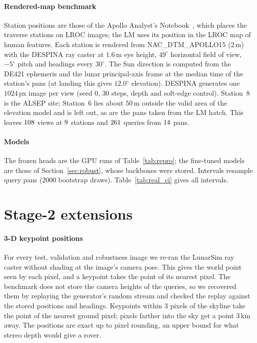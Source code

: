 \documentclass[letterpaper,journal]{IEEEtran}
\begin{document}
\paragraph*{Rendered-map benchmark} Station positions are those of the Apollo Analyst's
Notebook~\cite{apolloanalyst}, which places the traverse stations on LROC images; the LM uses its position in
the LROC map of human features. Each station is rendered from NAC\_DTM\_APOLLO15 (2\,m) with the DESPINA ray
caster at $1.6$\,m eye height, $49^\circ$ horizontal field of view, $-5^\circ$ pitch and headings every
$30^\circ$. The Sun direction is computed from the DE421 ephemeris and the lunar principal-axis frame at the
median time of the station's pans (at landing this gives $12.0^\circ$ elevation). DESPINA generates one
$1024$\,px image per view (seed $0$, $30$ steps, depth and soft-edge control). Station~8 is the ALSEP site;
Station~6 lies about $50$\,m outside the valid area of the elevation model and is left out, as are the pans
taken from the LM hatch. This leaves $108$ views at $9$ stations and $261$ queries from
$14$ pans.

\paragraph*{Models} The frozen heads are the GPU runs of Table~\ref{tab:repro}; the fine-tuned models are
those of Section~\ref{sec:robust}, whose backbones were stored. Intervals resample query pans ($2000$
bootstrap draws). Table~\ref{tab:real_ci} gives all intervals.


\section{Stage-2 extensions}\label{sec:stage2supp}
\paragraph*{3-D keypoint positions} For every test, validation and robustness image we re-ran the
LunarSim ray caster without shading at the image's camera pose. This gives the world point seen by each
pixel, and a keypoint takes the point of its nearest pixel. The benchmark does not store the camera
heights of the queries, so we recovered them by replaying the generator's random stream and checked the
replay against the stored positions and headings. Keypoints within $3$ pixels of the skyline take the
point of the nearest ground pixel; pixels farther into the sky get a point $3$\,km away. The positions are
exact up to pixel rounding, an upper bound for what stereo depth would give a rover.
\end{document}
